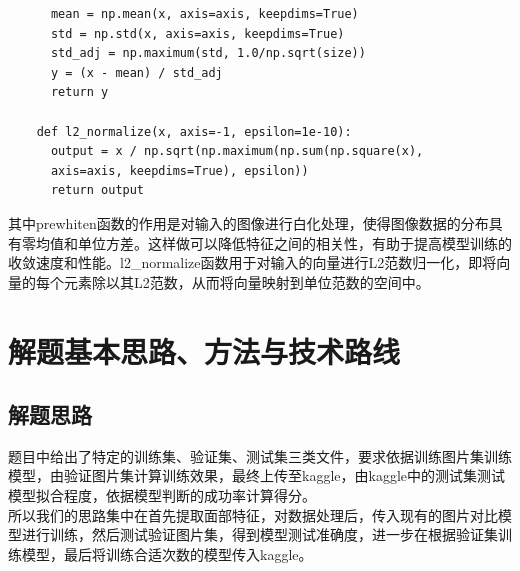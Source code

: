 \documentclass[UTF8]{ctexart}
\begin{document}
\begin{enumerate}
\begin{verbatim}
      mean = np.mean(x, axis=axis, keepdims=True)
      std = np.std(x, axis=axis, keepdims=True)
      std_adj = np.maximum(std, 1.0/np.sqrt(size))
      y = (x - mean) / std_adj
      return y

    def l2_normalize(x, axis=-1, epsilon=1e-10):
      output = x / np.sqrt(np.maximum(np.sum(np.square(x), 
      axis=axis, keepdims=True), epsilon))
      return output
  \end{verbatim}
  其中prewhiten函数的作用是对输入的图像进行白化处理，使得图像数据的分布具有零均值和单位方差。这样做可以降低特征之间的相关性，有助于提高模型训练的收敛速度和性能。l2\_normalize函数用于对输入的向量进行L2范数归一化，即将向量的每个元素除以其L2范数，从而将向量映射到单位范数的空间中。
  
\end{enumerate}

\section{解题基本思路、方法与技术路线}
\subsection{解题思路}
题目中给出了特定的训练集、验证集、测试集三类文件，要求依据训练图片集训练模型，由验证图片集计算训练效果，最终上传至kaggle，由kaggle中的测试集测试模型拟合程度，依据模型判断的成功率计算得分。\\
所以我们的思路集中在首先提取面部特征，对数据处理后，传入现有的图片对比模型进行训练，然后测试验证图片集，得到模型测试准确度，进一步在根据验证集训练模型，最后将训练合适次数的模型传入kaggle。
\end{document}
